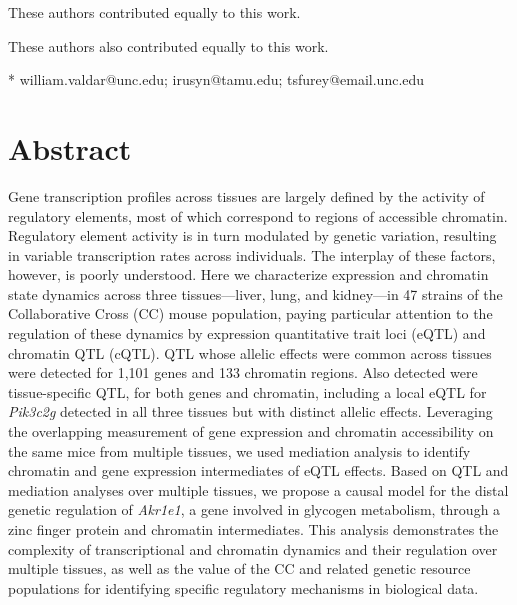 \documentclass[10pt,letterpaper]{article}
\begin{document}
\begin{flushleft}
% 
%
\Yinyang These authors contributed equally to this work.

\ddag These authors also contributed equally to this work.




* william.valdar@unc.edu; irusyn@tamu.edu; tsfurey@email.unc.edu

\end{flushleft}
\section*{Abstract}
Gene transcription profiles across tissues are largely defined by the activity of regulatory elements, most of which correspond to regions of accessible chromatin. Regulatory element activity is in turn modulated by genetic variation, resulting in variable transcription rates across individuals. The interplay of these factors, however, is poorly understood. Here we characterize expression and chromatin state dynamics across three tissues---liver, lung, and kidney---in 47 strains of the Collaborative Cross (CC) mouse population, paying particular attention to the regulation of these dynamics by expression quantitative trait loci (eQTL) and chromatin QTL (cQTL). QTL whose allelic effects were common across tissues were detected for 1,101 genes and 133 chromatin regions. Also detected were tissue-specific QTL, for both genes and chromatin, including a local eQTL for \textit{Pik3c2g} detected in all three tissues but with distinct allelic effects. Leveraging the overlapping measurement of gene expression and chromatin accessibility on the same mice from multiple tissues, we used mediation analysis to identify chromatin and gene expression intermediates of eQTL effects. Based on QTL and mediation analyses over multiple tissues, we propose a causal model for the distal genetic regulation of \textit{Akr1e1}, a gene involved in glycogen metabolism, through a zinc finger protein and chromatin intermediates. This analysis demonstrates the complexity of transcriptional and chromatin dynamics and their regulation over multiple tissues, as well as the value of the CC and related genetic resource populations for identifying specific regulatory mechanisms in biological data.
\end{document}
